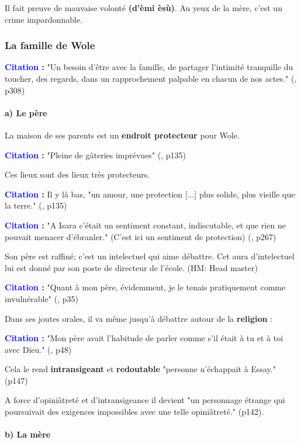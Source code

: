 \documentclass[a4paper, 11pt, hidelinks]{article}
\newcommand{\bs}{\bigskip}
\newcommand{\cit}{\large \textcolor{blue}{\textbf{Citation :}} \large }
\newcommand{\rb}[1]{\Romanbar{#1}}
\begin{document}
Il fait preuve de mauvaise volonté \textbf{(d'èmi èsù)}. Au yeux de la mère, c'est un crime impardonnable.


\subsubsection{La famille de Wole}


\cit "Un besoin d'être avec la famille, de partager l'intimité tranquille du toucher, des regards, dans un rapprochement palpable en chacun de nos actes." (\rb{11}, p308)


\paragraph{a) Le père}


La maison de ses parents est un \textbf{endroit protecteur} pour Wole.

\cit "Pleine de gâteries imprévues" (\rb{5}, p135)

\bs
Ces lieux sont des lieux très protecteurs.

\cit Il y là bas, "un amour, une protection [...] plus solide, plus vieille que la terre." (\rb{5}, p135)

\cit"A Isara c'était un sentiment constant, indiscutable, et que rien ne pouvait menacer d'ébranler." (C'est ici un sentiment de protection) (\rb{9}, p267)
\bs

Son père est raffiné; c'est un intelectuel qui aime débattre. Cet aura d'intelectuel lui est donné par son poste de directeur de l'école. (HM: Head master)

\cit "Quant à mon père, évidemment, je le tenais pratiquement comme invulnérable" (\rb{1}, p35)

\smallskip
Dans ses joutes orales, il va même jusqu'à débattre autour de la \textbf{religion} :

\cit "Mon père avait l'habitude de parler comme s'il était à tu et à toi avec Dieu." (\rb{1}, p48)

\smallskip
Cela le rend \textbf{intransigeant} et \textbf{redoutable} "personne n'échappait à Essay." (p147)

A force d'opiniâtreté et d'intransigeance il devient "un personnage étrange qui poursuivait des exigences impossibles avec une telle opiniâtreté." (p142).





\paragraph{b) La mère}
\end{document}
